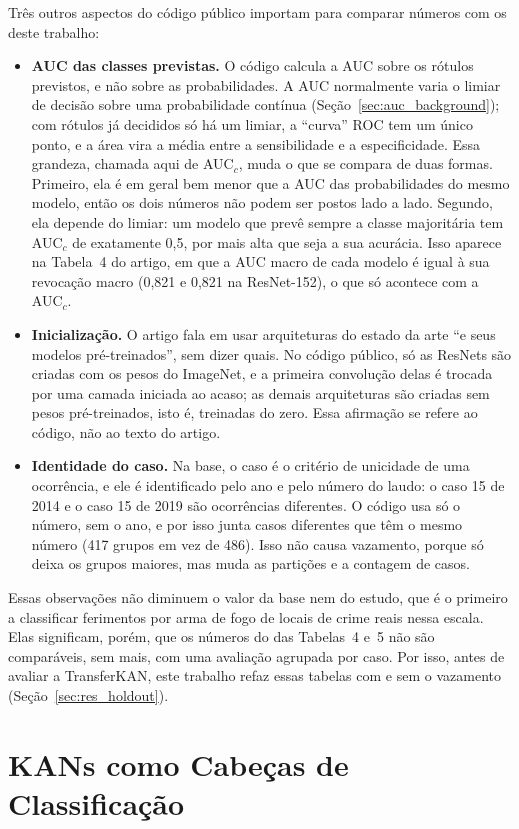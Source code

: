 Três outros aspectos do código público importam para comparar números com os deste trabalho:
\begin{itemize}
    \item \textbf{AUC das classes previstas.} O código calcula a AUC sobre os rótulos previstos, e não sobre as probabilidades. A AUC normalmente varia o limiar de decisão sobre uma probabilidade contínua (Seção~\ref{sec:auc_background}); com rótulos já decididos só há um limiar, a ``curva'' \gls{ROC} tem um único ponto, e a área vira a média entre a sensibilidade e a especificidade. Essa grandeza, chamada aqui de AUC$_c$, muda o que se compara de duas formas. Primeiro, ela é em geral bem menor que a AUC das probabilidades do mesmo modelo, então os dois números não podem ser postos lado a lado. Segundo, ela depende do limiar: um modelo que prevê sempre a classe majoritária tem AUC$_c$ de exatamente 0,5, por mais alta que seja a sua acurácia. Isso aparece na Tabela~4 do artigo, em que a AUC macro de cada modelo é igual à sua revocação macro (0,821 e 0,821 na ResNet-152), o que só acontece com a AUC$_c$.
    \item \textbf{Inicialização.} O artigo fala em usar arquiteturas do estado da arte ``e seus modelos pré-treinados'', sem dizer quais. No código público, só as ResNets são criadas com os pesos do ImageNet, e a primeira convolução delas é trocada por uma camada iniciada ao acaso; as demais arquiteturas são criadas sem pesos pré-treinados, isto é, treinadas do zero. Essa afirmação se refere ao código, não ao texto do artigo.
    \item \textbf{Identidade do caso.} Na base, o caso é o critério de unicidade de uma ocorrência, e ele é identificado pelo ano e pelo número do laudo: o caso 15 de 2014 e o caso 15 de 2019 são ocorrências diferentes. O código usa só o número, sem o ano, e por isso junta casos diferentes que têm o mesmo número (417 grupos em vez de 486). Isso não causa vazamento, porque só deixa os grupos maiores, mas muda as partições e a contagem de casos.
\end{itemize}
Essas observações não diminuem o valor da base nem do estudo, que é o primeiro a classificar ferimentos por arma de fogo de locais de crime reais nessa escala. Elas significam, porém, que os números do  das Tabelas~4 e~5 não são comparáveis, sem mais, com uma avaliação agrupada por caso. Por isso, antes de avaliar a TransferKAN, este trabalho refaz essas tabelas com e sem o vazamento (Seção~\ref{sec:res_holdout}).

\section{KANs como Cabeças de Classificação}
\label{sec:kan_related}

